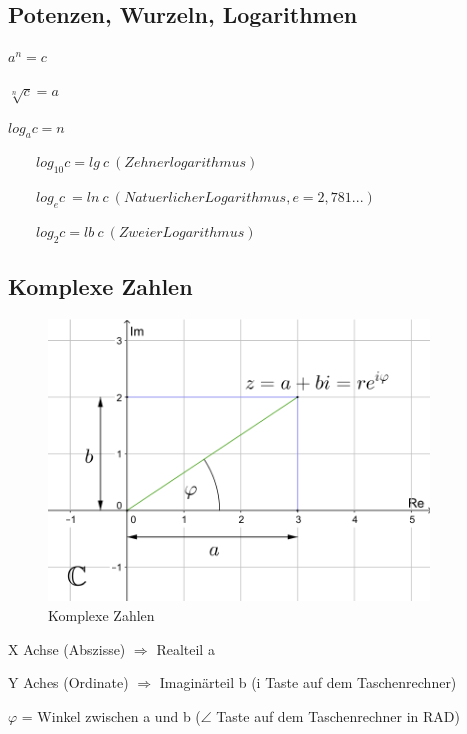 \documentclass[12pt,a4paper]{article}
\begin{document}
\subsection{Potenzen, Wurzeln, Logarithmen}
\begin{description}
\item $a^{n}=c$
\item $\sqrt[n]{c}=a$
\item $log_{a}c=n$
\item ~~~~$log_{10}c = lg~c~(Zehnerlogarithmus)$
\item ~~~~$log_{e}c ~= ln~c~(Natuerlicher Logarithmus, e=2,781...)$
\item ~~~~$log_{2}c = lb~c~(Zweier Logarithmus)$
\end{description}

\pagebreak
\subsection{Komplexe Zahlen}
\begin{figure}[h]
 \centering
 \includegraphics[width=0.9\textwidth]{"bild5.png"}
 \caption{Komplexe Zahlen}
 \label{fig:komplzahl}
\end{figure}
\begin{description}
\item X Achse (Abszisse) $\Rightarrow$ Realteil a
\item Y Aches (Ordinate) $\Rightarrow$ Imaginärteil b (i Taste auf dem Taschenrechner)
\item $\varphi$ = Winkel zwischen a und b ($\angle$ Taste auf dem Taschenrechner in RAD) 
\end{description}
\end{document}
